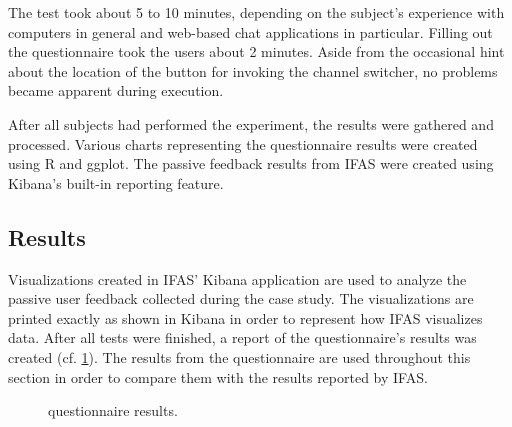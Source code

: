 The test took about 5 to 10 minutes, depending on the subject's experience with computers in general and web-based chat applications in particular.
Filling out the questionnaire took the users about 2 minutes.
Aside from the occasional hint about the location of the button for invoking the channel switcher, no problems became apparent during execution.

After all subjects had performed the experiment, the results were gathered and processed.
Various charts representing the questionnaire results were created using R and ggplot.
The passive feedback results from \ac{IFAS} were created using Kibana's built-in reporting feature.

\subsection{Results}

Visualizations created in \ac{IFAS}' Kibana application are used to analyze the passive user feedback collected during the case study.
The visualizations are printed exactly as shown in Kibana in order to represent how \ac{IFAS} visualizes data.
After all tests were finished, a report of the questionnaire's results was created (cf. \cref{figure:evaluation:user:survey-report}).
The results from the questionnaire are used throughout this section in order to compare them with the results reported by \ac{IFAS}.

\begin{figure}[h]
        \caption{questionnaire results.}
        \label{figure:evaluation:user:survey-report}
\end{figure}


